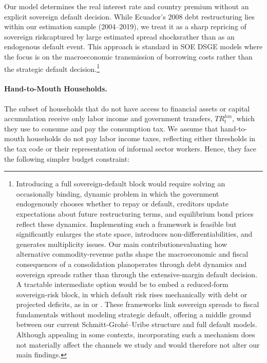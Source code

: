 \documentclass[12pt]{article}
\begin{document}
Our model determines the real interest rate and country premium without an explicit sovereign default decision. While Ecuador’s 2008 debt restructuring lies within our estimation sample (2004–2019), we treat it as a sharp repricing of sovereign risk\textemdash captured by large estimated spread shocks\textemdash rather than as an endogenous default event. This approach is standard in SOE DSGE models where the focus is on the macroeconomic transmission of borrowing costs rather than the strategic default decision.\footnote{Introducing a full sovereign-default block would require solving an occasionally binding, dynamic problem in which the government endogenously chooses whether to repay or default, creditors update expectations about future restructuring terms, and equilibrium bond prices reflect these dynamics. Implementing such a framework is feasible but significantly enlarges the state space, introduces non-differentiabilities, and generates multiplicity issues. Our main contribution\textemdash evaluating how alternative commodity-revenue paths shape the macroeconomic and fiscal consequences of a consolidation plan\textemdash operates through debt dynamics and sovereign spreads rather than through the extensive-margin default decision. A tractable intermediate option would be to embed a reduced‑form sovereign‑risk block, in which default risk rises mechanically with debt or projected deficits, as in \citet{Corsettietal13} or \citet{Cantoreetal19}. These frameworks link sovereign spreads to fiscal fundamentals without modeling strategic default, offering a middle ground between our current Schmitt‑Grohé–Uribe structure and full default models. Although appealing in some contexts, incorporating such a mechanism does not materially affect the channels we study and would therefore not alter our main findings.}

\paragraph{Hand-to-Mouth Households.}

The subset of households that do not have access to financial assets or capital accumulation receive only labor income and government transfers, $TR^{hm}_t$, which they use to consume and pay the consumption tax. We assume that hand-to-mouth households do not pay labor income taxes, reflecting either thresholds in the tax code or their representation of informal sector workers. Hence, they face the following simpler budget constraint:
\end{document}
